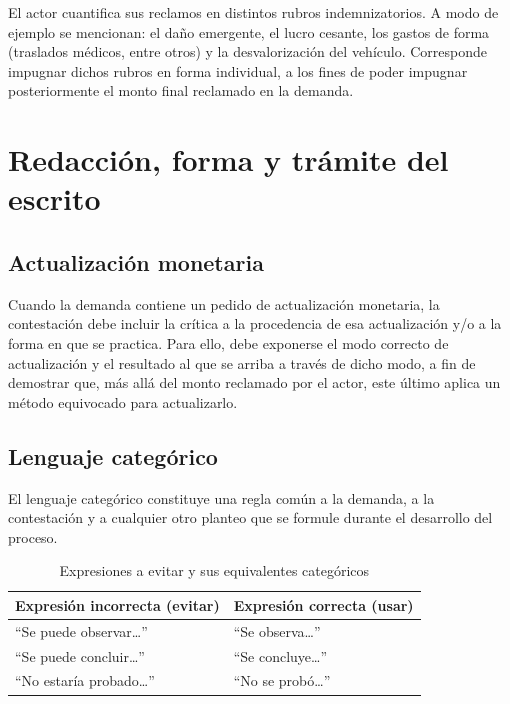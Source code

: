 \documentclass[12pt,oneside]{book}
\begin{document}
El actor cuantifica sus reclamos en distintos rubros indemnizatorios. A modo de ejemplo se mencionan: el daño emergente, el lucro cesante, los gastos de forma (traslados médicos, entre otros) y la desvalorización del vehículo. Corresponde impugnar dichos rubros en forma individual, a los fines de poder impugnar posteriormente el monto final reclamado en la demanda.

\chapter{Redacción, forma y trámite del escrito}

\section{Actualización monetaria}

Cuando la demanda contiene un pedido de actualización monetaria, la contestación debe incluir la crítica a la procedencia de esa actualización y/o a la forma en que se practica. Para ello, debe exponerse el modo correcto de actualización y el resultado al que se arriba a través de dicho modo, a fin de demostrar que, más allá del monto reclamado por el actor, este último aplica un método equivocado para actualizarlo.

\section{Lenguaje categórico}

El lenguaje categórico constituye una regla común a la demanda, a la contestación y a cualquier otro planteo que se formule durante el desarrollo del proceso.

\begin{table}[H]
\centering
\caption{Expresiones a evitar y sus equivalentes categóricos}
\begin{tabularx}{\textwidth}{>{\raggedright\arraybackslash}X >{\raggedright\arraybackslash}X}
\toprule
\textbf{Expresión incorrecta (evitar)} & \textbf{Expresión correcta (usar)} \\
\midrule
``Se puede observar\ldots'' & ``Se observa\ldots'' \\
``Se puede concluir\ldots'' & ``Se concluye\ldots'' \\
``No estaría probado\ldots'' & ``No se probó\ldots'' \\
\bottomrule
\end{tabularx}
\end{table}
\end{document}
